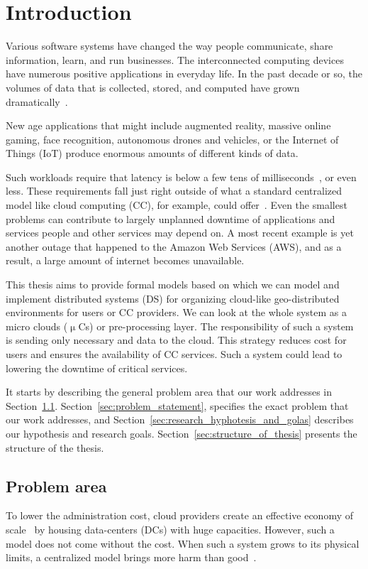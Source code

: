 \pagestyle{fancy}
\fancyhf{}
\fancyhead[RE,LO]{\leftmark}
\fancyfoot[CE,CO]{\thepage}
\chapter{Introduction}\label{chapter:Intro}
%
Various software systems have changed the way people communicate, share information, learn, and run businesses. The interconnected computing devices have numerous positive applications in everyday life. In the past decade or so, the volumes of data that is collected, stored, and computed have grown dramatically~\cite{ChiangZ16}. 

New age applications that might include augmented reality, massive online gaming, face recognition, autonomous drones and vehicles, or the Internet of Things (IoT) produce enormous amounts of different kinds of data. 

Such workloads require that latency is below a few tens of milliseconds~\cite{ChiangZ16}, or even less. These requirements fall just right outside of what a standard centralized model like cloud computing (CC), for example, could offer~\cite{ChiangZ16}. Even the smallest problems can contribute to largely unplanned downtime of applications and services people and other services may depend on. A most recent example is yet another outage that happened to the Amazon Web Services (AWS), and as a result, a large amount of internet becomes unavailable.

This thesis aims to provide formal models based on which we can model and implement distributed systems (DS) for organizing cloud-like geo-distributed environments for users or CC providers. We can look at the whole system as a micro clouds ($\upmu$Cs) or pre-processing layer. The responsibility of such a system is sending only necessary and data to the cloud. This strategy reduces cost for users and ensures the availability of CC services. Such a system could lead to lowering the downtime of critical services.

It starts by describing the general problem area that our work addresses in Section~\ref{sec:problem_area}. Section~\ref{sec:problem_statement}, specifies the exact problem that our work addresses, and Section~\ref{sec:research_hyphotesis_and_golas} describes our hypothesis and research goals. Section~\ref{sec:structure_of_thesis} presents the structure of the thesis.
%
%
%
\section{Problem area}\label{sec:problem_area}
%
To lower the administration cost, cloud providers create an effective economy of scale~\cite{BariBEGPRZZ13} by housing data-centers (DCs) with huge capacities. However, such a model does not come without the cost. When such a  system grows to its physical limits, a centralized model brings more harm than good~\cite{GunawiHSLSAE16, LopezMEDHIBFR15}. 

